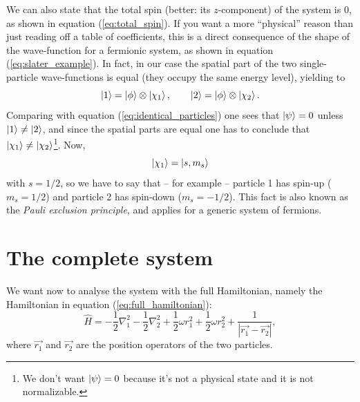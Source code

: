 \documentclass[a4paper,twoside,11pt]{book}
\begin{document}
We can also state that the total spin (better: its $z$-component) of the system is 0, as shown in equation (\ref{eq:total_spin}). If you want a more ``physical'' reason than just reading off a table of coefficients, this is a direct consequence of the shape of the wave-function for a fermionic system, as shown in equation (\ref{eq:slater_example}). In fact, in our case the spatial part of the two single-particle wave-functions is equal (they occupy the same energy level), yielding to
\begin{equation}
	\Ket{1} = \Ket{\phi}\otimes\Ket{\chi_1},
	\qquad
	\Ket{2} = \Ket{\phi}\otimes\Ket{\chi_2}.
\end{equation}
Comparing with equation (\ref{eq:identical_particles}) one sees that $\Ket{\psi} = 0$ unless $\Ket{1} \neq \Ket{2}$, and since the spatial parts are equal one has to conclude that $\Ket{\chi_1} \neq \Ket{\chi_2}$\footnote{We don't want $\Ket{\psi} = 0$ because it's not a physical state and it is not normalizable.}. Now, 
\begin{equation}
	\Ket{\chi_1} = \Ket{s,m_s}
\end{equation}
with $s=1/2$, so we have to say that -- for example -- particle 1 has spin-up ($m_s=1/2$) and particle 2 has spin-down ($m_s=-1/2$). This fact is also known as the \emph{Pauli exclusion principle}, and applies for a generic system of fermions.

\section{The complete system}
We want now to analyse the system with the full Hamiltonian, namely the Hamiltonian in equation (\ref{eq:full_hamiltonian}):
\begin{equation}
	\hat{H}=-\frac{1}{2} \nabla^2_1 - \frac{1}{2} \nabla^2_2+\frac{1}{2}\omega r_1^2+\frac{1}{2}\omega r_2^2+ \frac{1}{|\vec{r_1}-\vec{r_2}|},
\end{equation}
where $\vec{r_1}$ and $\vec{r_2}$ are the position operators of the two particles.
\end{document}
